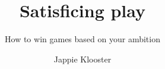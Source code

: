 \documentclass[a4paper, twoside,%
11pt]{malrep}
\begin{document}

\title{Satisficing play}
\subtitle{How to win games based on your ambition}
\author{Jappie Klooster}

\maketitle

\begin{article}
  
\end{article}
\end{document}

